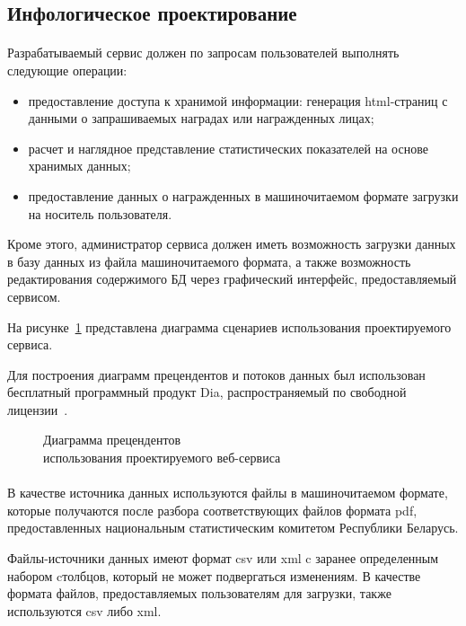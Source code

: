 \subsection{Инфологическое проектирование}
\label{ssub:db_info_stage}

\paragraph{}
Разрабатываемый сервис должен по запросам пользователей выполнять
следующие операции:
\begin{itemize}
\item
  предоставление доступа к хранимой информации: генерация html-страниц с данными
  о запрашиваемых наградах или награжденных лицах;
\item
  расчет и наглядное представление статистических показателей на
  основе хранимых данных;
\item
  предоставление данных о награжденных в машиночитаемом формате 
  загрузки на носитель пользователя. 
\end{itemize}

Кроме этого, администратор сервиса должен иметь возможность загрузки данных в базу данных
из файла машиночитаемого формата, а также возможность редактирования содержимого БД
через графический интерфейс, предоставляемый сервисом.

На рисунке~\ref{fig:use-case_diagram} представлена диаграмма сценариев
использования проектируемого сервиса.

Для построения диаграмм прецендентов и потоков данных был использован бесплатный
программный продукт Dia, распространяемый по свободной лицензии~\cite{dia_license}.
\begin{figure}[h!]
  \centering
  \small{
    
  }
  \caption{Диаграмма прецендентов \\ использования проектируемого веб-сервиса}
  \label{fig:use-case_diagram}
\end{figure}

\paragraph{}
В качестве источника данных используются файлы в машиночитаемом формате,
которые получаются после разбора соответствующих файлов формата pdf,
предоставленных национальным статистическим комитетом Республики Беларусь.

Файлы-источники данных имеют формат csv или xml c заранее определенным
набором cтолбцов, который не может подвергаться изменениям.
В качестве формата файлов, предоставляемых пользователям для загрузки,
также используются csv либо xml.

